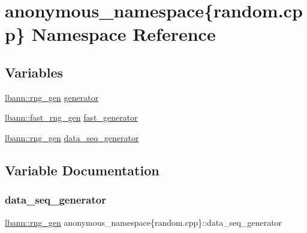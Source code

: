 \hypertarget{namespaceanonymous__namespace_02random_8cpp_03}{}\section{anonymous\+\_\+namespace\{random.\+cpp\} Namespace Reference}
\label{namespaceanonymous__namespace_02random_8cpp_03}
\subsection*{Variables}
\begin{DoxyCompactItemize}
\item 
\hyperlink{namespacelbann_aab7fa584bac85b9085aa8b8c5a888356}{lbann\+::rng\+\_\+gen} \hyperlink{namespaceanonymous__namespace_02random_8cpp_03_a83826c4b587d1825f13b833be6fe047f}{generator}
\item 
\hyperlink{namespacelbann_af16616ffa6a3616836eabadd6ce837ec}{lbann\+::fast\+\_\+rng\+\_\+gen} \hyperlink{namespaceanonymous__namespace_02random_8cpp_03_a349f572cec05cd0e2469b799774a8602}{fast\+\_\+generator}
\item 
\hyperlink{namespacelbann_aab7fa584bac85b9085aa8b8c5a888356}{lbann\+::rng\+\_\+gen} \hyperlink{namespaceanonymous__namespace_02random_8cpp_03_ac1d3d0259f3e9c9b75e9701ae727d16e}{data\+\_\+seq\+\_\+generator}
\end{DoxyCompactItemize}


\subsection{Variable Documentation}
\mbox{\label{namespaceanonymous__namespace_02random_8cpp_03_ac1d3d0259f3e9c9b75e9701ae727d16e}} 
\subsubsection{\texorpdfstring{data\+\_\+seq\+\_\+generator}{data\_seq\_generator}}
{\footnotesize\ttfamily \hyperlink{namespacelbann_aab7fa584bac85b9085aa8b8c5a888356}{lbann\+::rng\+\_\+gen} anonymous\+\_\+namespace\{random.\+cpp\}\+::data\+\_\+seq\+\_\+generator}



